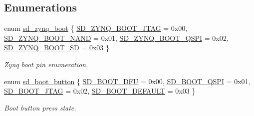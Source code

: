 \subsection*{Enumerations}
\begin{DoxyCompactItemize}
\item 
enum \mbox{\hyperlink{group___s_d___platform_ga06667de95c86bfcdef8bcc8ab13cb2d4}{sd\+\_\+zynq\+\_\+boot}} \{ \mbox{\hyperlink{group___s_d___platform_gga06667de95c86bfcdef8bcc8ab13cb2d4aa0c510b780474f1292f04a8b7b987a76}{S\+D\+\_\+\+Z\+Y\+N\+Q\+\_\+\+B\+O\+O\+T\+\_\+\+J\+T\+AG}} = 0x00, 
\mbox{\hyperlink{group___s_d___platform_gga06667de95c86bfcdef8bcc8ab13cb2d4ad270040d99cf171dc127ebca46e82c54}{S\+D\+\_\+\+Z\+Y\+N\+Q\+\_\+\+B\+O\+O\+T\+\_\+\+N\+A\+ND}} = 0x01, 
\mbox{\hyperlink{group___s_d___platform_gga06667de95c86bfcdef8bcc8ab13cb2d4a85166851f8dac48bd3b4261debe97472}{S\+D\+\_\+\+Z\+Y\+N\+Q\+\_\+\+B\+O\+O\+T\+\_\+\+Q\+S\+PI}} = 0x02, 
\mbox{\hyperlink{group___s_d___platform_gga06667de95c86bfcdef8bcc8ab13cb2d4af1351df506cd9586ffcd35813fa3f5f9}{S\+D\+\_\+\+Z\+Y\+N\+Q\+\_\+\+B\+O\+O\+T\+\_\+\+SD}} = 0x03
 \}
\begin{DoxyCompactList}\small\item\em Zynq boot pin enumeration. \end{DoxyCompactList}\item 
enum \mbox{\hyperlink{group___s_d___platform_ga0cfdf02c4e2dcebe57216fb62c79d464}{sd\+\_\+boot\+\_\+button}} \{ \mbox{\hyperlink{group___s_d___platform_gga0cfdf02c4e2dcebe57216fb62c79d464acf258a74260a98b634ec614263a43f12}{S\+D\+\_\+\+B\+O\+O\+T\+\_\+\+D\+FU}} = 0x00, 
\mbox{\hyperlink{group___s_d___platform_gga0cfdf02c4e2dcebe57216fb62c79d464ad894ca3fbbd2ec66227b60650567bddb}{S\+D\+\_\+\+B\+O\+O\+T\+\_\+\+Q\+S\+PI}} = 0x01, 
\mbox{\hyperlink{group___s_d___platform_gga0cfdf02c4e2dcebe57216fb62c79d464af990e7ab412748b5978df97d0d1b0518}{S\+D\+\_\+\+B\+O\+O\+T\+\_\+\+J\+T\+AG}} = 0x02, 
\mbox{\hyperlink{group___s_d___platform_gga0cfdf02c4e2dcebe57216fb62c79d464a8302e6d19404f342f1a92dd12d32dc85}{S\+D\+\_\+\+B\+O\+O\+T\+\_\+\+D\+E\+F\+A\+U\+LT}} = 0x03
 \}
\begin{DoxyCompactList}\small\item\em Boot button press state. \end{DoxyCompactList}\end{DoxyCompactItemize}
